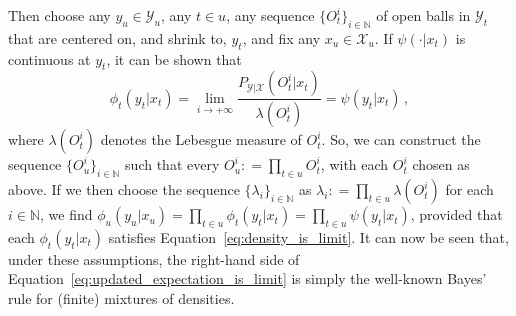 \documentclass[twoside,11pt]{article}
\newcommand{\nats}{\mathbb{N}}
\newcommand{\states}{\mathcal{X}}
\newcommand{\observs}{\mathcal{Y}}
\newcommand{\coloneqq}{:\!=}
\begin{document}
Then choose any $y_u\in\observs_u$, any $t\in u$, any sequence $\{O_t^i\}_{i\in\nats}$ of open balls in $\observs_t$ that are centered on, and shrink to, $y_t$, and fix any $x_u\in\states_u$. If $\psi(\cdot\vert x_t)$ is continuous at $y_t$, it can be shown that
\begin{equation}\label{eq:density_is_limit}
\phi_t(y_t\vert x_t) = \lim_{i\to+\infty} \frac{P_{\observs\vert\states}(O_t^i\vert x_t)}{\lambda(O_t^i)} = \psi(y_t\vert x_t)\,,
\end{equation}
where $\lambda(O_t^i)$ denotes the Lebesgue measure of $O_t^i$. So, we can construct the sequence $\{O_u^i\}_{i\in\nats}$ such that every $O_u^i\coloneqq \prod_{t\in u}O_t^i$, with each $O_t^i$ chosen as above. If we then choose the sequence $\{\lambda_i\}_{i\in\nats}$ as $\lambda_i\coloneqq \prod_{t\in u}\lambda(O_t^i)$ for each $i\in\nats$, we find 
$\phi_u(y_u\vert x_u) = \prod_{t\in u}\phi_t(y_t\vert x_t)=\prod_{t\in u}\psi(y_t\vert x_t)$, 
provided that each $\phi_t(y_t\vert x_t)$ satisfies Equation~\eqref{eq:density_is_limit}. %
%
It can now be seen that, under these assumptions, the right-hand side of Equation~\eqref{eq:updated_expectation_is_limit} is simply the well-known Bayes' rule for (finite) mixtures of densities. 
\end{document}
